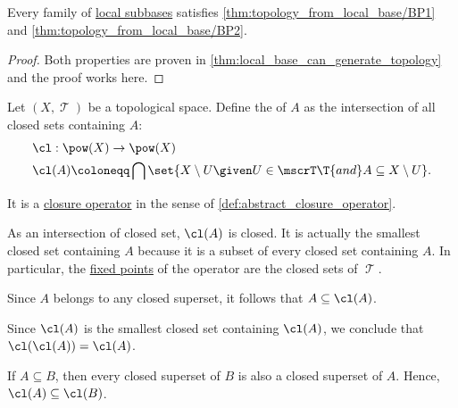 \begin{proposition}\label{thm:local_subbase_can_generate_topology}
  Every family of \hyperref[def:topological_local_subbase]{local subbases} satisfies \ref{thm:topology_from_local_base/BP1} and \ref{thm:topology_from_local_base/BP2}.
\end{proposition}
\begin{proof}
  Both properties are proven in \cref{thm:local_base_can_generate_topology} and the proof works here.
\end{proof}

\begin{definition}\label{def:topological_closure_operator}
  Let \( (X, \mscrT) \) be a topological space. Define the  of \( A \) as the intersection of all closed sets containing \( A \):
  \begin{equation*}
    \begin{aligned}
      &\cl: \pow(X) \to \pow(X) \\
      &\cl(A) \coloneqq \bigcap \set{ X \setminus U \given U \in \mscrT \T{and} A \subseteq X \setminus U }.
    \end{aligned}
  \end{equation*}

  It is a \hyperref[def:abstract_closure_operator]{closure operator} in the sense of \cref{def:abstract_closure_operator}.
\end{definition}
\begin{comments}
  \item As an intersection of closed set, \( \cl(A) \) is closed. It is actually the smallest closed set containing \( A \) because it is a subset of every closed set containing \( A \). In particular, the \hyperref[def:function_fixed_point]{fixed points} of the operator are the closed sets of \( \mscrT \).
\end{comments}
\begin{defproof}
   Since \( A \) belongs to any closed superset, it follows that \( A \subseteq \cl(A) \).

   Since \( \cl(A) \) is the smallest closed set containing \( \cl(A) \), we conclude that \( \cl(\cl(A)) = \cl(A) \).

   If \( A \subseteq B \), then every closed superset of \( B \) is also a closed superset of \( A \). Hence, \( \cl(A) \subseteq \cl(B) \).
\end{defproof}

